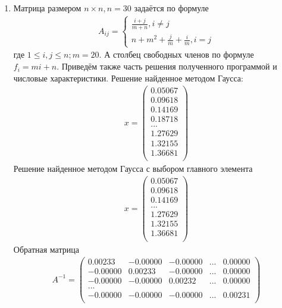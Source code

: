 \documentclass[a4paper,12pt,titlepage,finall]{article}
\begin{document}
\begin{enumerate}
\item
Матрица размером $n \times n, n = 30$ задаётся по формуле
\begin{align}
A_{ij} = \left\{
\begin{array}{ll}
\frac{i+j}{m+n}, i \neq j\\
n + m^2 + \frac{j}{m} + \frac{i}{m}, i = j
\end{array}
\right.
\end{align}
где $1 \leq i,j \leq n; m = 20$. А столбец свободных членов по формуле $f_i = mi + n$. Приведём также часть решения полученного программой и числовые характеристики.
Решение найденное методом Гаусса:
\begin{align*}
x = \begin{pmatrix}
0.05067 \\
   0.09618 \\
   0.14169 \\
   0.18718 \\
   ...\\
   1.27629 \\
   1.32155 \\
   1.36681 \\
\end{pmatrix}
\end{align*}
Решение найденное методом Гаусса с выбором главного элемента
\begin{align*}
x = \begin{pmatrix}
  0.05067 \\
   0.09618 \\
   0.14169 \\
   ...\\
   1.27629 \\
   1.32155 \\
   1.36681 \\
\end{pmatrix}
\end{align*}
Обратная матрица
\begin{align*}
A^{-1} = \begin{pmatrix}
    0.00233&    -0.00000&    -0.00000& ... &0.00000\\
   -0.00000&     0.00233&    -0.00000& ... &0.00000\\
   -0.00000&    -0.00000&     0.00232& ... &0.00000\\
   ...\\
   -0.00000&    -0.00000&    -0.00000& ... &0.00231\\
\end{pmatrix}
\end{align*}

\end{enumerate}
\end{document}

